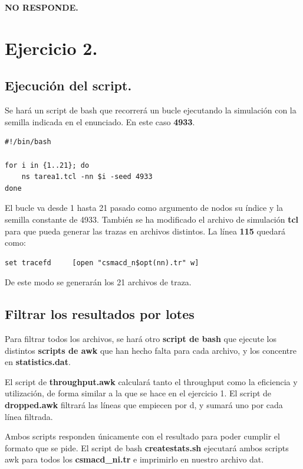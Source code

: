 \documentclass{article}
\begin{document}
\textbf{NO RESPONDE.}

\newpage
\section{Ejercicio 2.}

\subsection{Ejecución del script.}

Se hará un script de bash que recorrerá un bucle ejecutando la simulación con la semilla indicada en el enunciado. En este caso \textbf{4933}.

\begin{verbatim}
#!/bin/bash

for i in {1..21}; do
    ns tarea1.tcl -nn $i -seed 4933
done
\end{verbatim}

El bucle va desde 1 hasta 21 pasado como argumento de nodos su índice y la semilla constante de 4933. También se ha modificado el archivo de simulación \textbf{tcl} para que pueda generar las trazas en archivos distintos. La línea \textbf{115} quedará como:

\begin{verbatim}set tracefd     [open "csmacd_n$opt(nn).tr" w]\end{verbatim}

De este modo se generarán los 21 archivos de traza.

\subsection{Filtrar los resultados por lotes}

Para filtrar todos los archivos, se hará otro \textbf{script de bash} que ejecute los distintos \textbf{scripts de awk} que han hecho falta para cada archivo, y los concentre en \textbf{statistics.dat}.

El script de \textbf{throughput.awk} calculará tanto el throughput como la eficiencia y utilización, de forma similar a la que se hace en el ejercicio 1. El script de \textbf{dropped.awk} filtrará las líneas que empiecen por d, y sumará uno por cada línea filtrada.

Ambos scripts responden únicamente con el resultado para poder cumplir el formato que se pide. El script de bash \textbf{createstats.sh} ejecutará ambos scripts awk para todos los \textbf{csmacd\_ni.tr} e imprimirlo en nuestro archivo dat.
\end{document}

